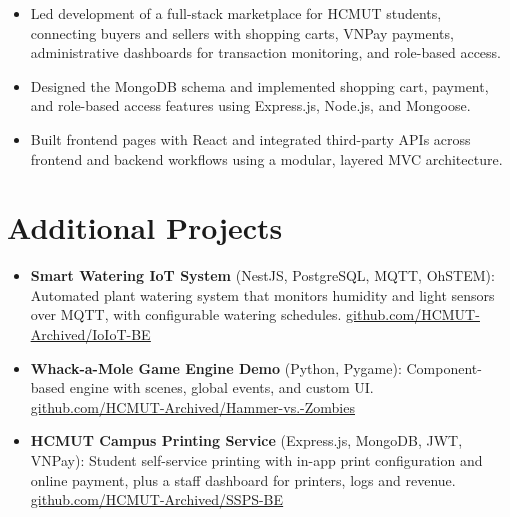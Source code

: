 \documentclass[10pt,a4paper]{article}
\newenvironment{resumeitems}{
    \begin{itemize}[
        leftmargin=1.1em,
        topsep=0.04em,
        itemsep=0pt,
        parsep=0pt,
        partopsep=0pt
    ]
}{
    \end{itemize}
}
\newcommand{\resumelink}[2]{%
    \href{#1}{\textcolor{linkColor}{\underline{#2}}}%
}
\begin{document}
\begin{resumeitems}
    \item Led development of a full-stack marketplace for HCMUT students, connecting buyers and sellers with shopping carts, VNPay payments, administrative dashboards for transaction monitoring, and role-based access.
    \item Designed the MongoDB schema and implemented shopping cart, payment, and role-based access features using Express.js, Node.js, and Mongoose.
    \item Built frontend pages with React and integrated third-party APIs across frontend and backend workflows using a modular, layered MVC architecture.
\end{resumeitems}

\section{Additional Projects}

\begin{resumeitems}
    \item \textbf{Smart Watering IoT System} (NestJS, PostgreSQL, MQTT, OhSTEM): Automated plant watering system that monitors humidity and light sensors over MQTT, with configurable watering schedules. \resumelink{https://github.com/HCMUT-Archived/IoIoT-BE}{github.com/HCMUT-Archived/IoIoT-BE}
    \item \textbf{Whack-a-Mole Game Engine Demo} (Python, Pygame): Component-based engine with scenes, global events, and custom UI. \resumelink{https://github.com/HCMUT-Archived/Hammer-vs.-Zombies}{github.com/HCMUT-Archived/Hammer-vs.-Zombies}
    \item \textbf{HCMUT Campus Printing Service} (Express.js, MongoDB, JWT, VNPay): Student self-service printing with in-app print configuration and online payment, plus a staff dashboard for printers, logs and revenue. \resumelink{https://github.com/HCMUT-Archived/SSPS-BE}{github.com/HCMUT-Archived/SSPS-BE}
\end{resumeitems}
\end{document}
